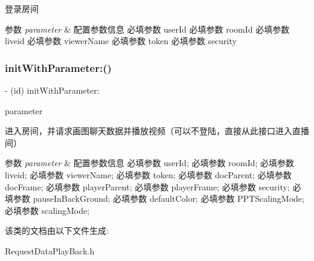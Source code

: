 登录房间 


\begin{DoxyParams}{参数}
{\em parameter} & 配置参数信息 必填参数 user\+Id 必填参数 room\+Id 必填参数 liveid 必填参数 viewer\+Name 必填参数 token 必填参数 security \\
\hline
\end{DoxyParams}
\mbox{\label{interface_request_data_play_back_a776ab7183abc45c9ca6c195e1717f29f}} 
\subsubsection{\texorpdfstring{init\+With\+Parameter\+:()}{initWithParameter:()}}
{\footnotesize\ttfamily -\/ (id) init\+With\+Parameter\+: \begin{DoxyParamCaption}\item[{(\hyperlink{interface_play_parameter}{Play\+Parameter} $\ast$)}]{parameter }\end{DoxyParamCaption}}



进入房间，并请求画图聊天数据并播放视频（可以不登陆，直接从此接口进入直播间） 


\begin{DoxyParams}{参数}
{\em parameter} & 配置参数信息 必填参数 user\+Id; 必填参数 room\+Id; 必填参数 liveid; 必填参数 viewer\+Name; 必填参数 token; 必填参数 doc\+Parent; 必填参数 doc\+Frame; 必填参数 player\+Parent; 必填参数 player\+Frame; 必填参数 security; 必填参数 pause\+In\+Back\+Ground; 必填参数 default\+Color; 必填参数 P\+P\+T\+Scaling\+Mode; 必填参数 scaling\+Mode; \\
\hline
\end{DoxyParams}


该类的文档由以下文件生成\+:\begin{DoxyCompactItemize}
\item 
Request\+Data\+Play\+Back.\+h\end{DoxyCompactItemize}

